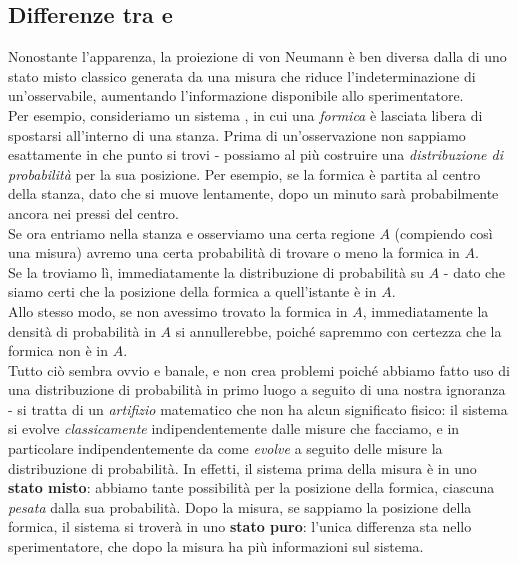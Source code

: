 \documentclass[../../FisicaTeorica.tex]{subfiles}
\begin{document}
\subsection{Differenze tra \MC e \MQ} 
Nonostante l'apparenza, la proiezione di von Neumann è ben diversa dalla  di uno stato misto classico generata da una misura che riduce  l'indeterminazione di un'osservabile, aumentando l'informazione disponibile allo sperimentatore.\\
Per esempio, consideriamo un sistema , in cui una \textit{formica} è lasciata libera di spostarsi all'interno di una stanza. Prima di un'osservazione non sappiamo esattamente in che punto si trovi - possiamo al più costruire una \textit{distribuzione di probabilità} per la sua posizione. Per esempio, se la formica è partita al centro della stanza, dato che si muove lentamente, dopo un minuto sarà probabilmente ancora nei pressi del centro.\\
Se ora entriamo nella stanza e osserviamo una certa regione $A$ (compiendo così una misura) avremo una certa probabilità di trovare o meno la formica in $A$.\\
Se la troviamo lì, immediatamente la distribuzione di probabilità  su $A$ - dato che siamo certi che la posizione della formica a quell'istante è in $A$.\\
Allo stesso modo, se non avessimo trovato la formica in $A$, immediatamente la densità di probabilità in $A$ si annullerebbe, poiché sapremmo con certezza che la formica non è in $A$.\\
Tutto ciò sembra ovvio e banale, e non crea problemi poiché abbiamo fatto uso di una distribuzione di probabilità in primo luogo a seguito di una nostra ignoranza - si tratta di un \textit{artifizio} matematico che non ha alcun significato fisico: il sistema si evolve \textit{classicamente} indipendentemente dalle misure che facciamo, e in particolare indipendentemente da come \textit{evolve} a seguito delle misure la distribuzione di probabilità. In effetti, il sistema prima della misura è in uno \textbf{stato misto}: abbiamo tante possibilità per la posizione della formica, ciascuna \textit{pesata} dalla sua probabilità. Dopo la misura, se sappiamo la posizione della formica, il sistema si troverà in uno \textbf{stato puro}: l'unica differenza sta nello sperimentatore, che dopo la misura ha più informazioni sul sistema.\\
\end{document}
